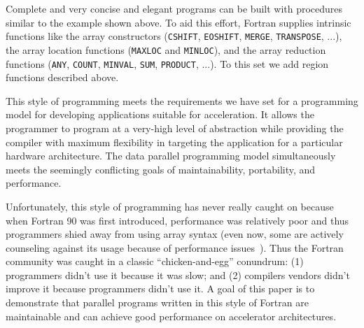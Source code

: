 
Complete and very concise and elegant programs can be built with procedures
similar to the example shown above. To aid this effort, Fortran
supplies intrinsic functions like the array constructors (\texttt{CSHIFT},
\texttt{EOSHIFT}, \texttt{MERGE}, \texttt{TRANSPOSE}, ...), the array location
functions (\texttt{MAXLOC} and \texttt{MINLOC}), and the array reduction
functions (\texttt{ANY}, \texttt{COUNT}, \texttt{MINVAL}, \texttt{SUM},
\texttt{PRODUCT}, ...).  To this set we add region functions described above.

This style of programming meets the requirements we have set for a programming
model for developing applications suitable for acceleration.  It allows the programmer to
program at a very-high level of abstraction while providing the compiler with
maximum flexibility in targeting the application for a particular hardware
architecture.  The data parallel programming model simultaneously meets the
seemingly conflicting goals of maintainability, portability, and performance.

Unfortunately, this style of programming has never really caught on because
when Fortran 90 was first introduced, performance was relatively poor and thus
programmers shied away from using array syntax (even now, some are actively
counseling against its usage because of performance issues~\cite{Levesque:SC08}).
Thus the Fortran community was caught in a classic ``chicken-and-egg''
conundrum: (1) programmers didn't use it because it was slow; and (2)
compilers vendors didn't improve it because programmers didn't use it.
A goal of this paper is to demonstrate that parallel programs written in
this style of Fortran are maintainable and can achieve good performance on
accelerator architectures.

